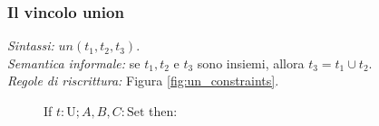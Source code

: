 \documentclass[12pt,a4paper,openright]{book} %
\begin{document}
\subsubsection{Il vincolo union}

\textit{Sintassi:} $un(t_1, t_2, t_3)$.\\
\noindent\textit{Semantica informale:} se $t_1, t_2$ e $t_3$ sono insiemi,  allora $t_3 = t_1 \cup t_2$.\\
\noindent\textit{Regole di riscrittura:} Figura \ref{fig:un_constraints}.

\begin{figure}
	\begin{tcolorbox}[colframe=black, colback=white, sharp corners]
		\setcounter{equation}{0}
		\renewcommand{\theequation}{$\cup$\textsubscript{\arabic{equation}}}
		
		If $t: \text{U}; A, B, C: \text{Set}$ then:
		

\end{tcolorbox}
\end{figure}
\end{document}
